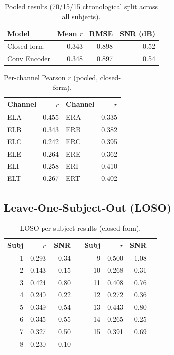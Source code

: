\documentclass[11pt,a4paper]{article}
\begin{document}
\begin{table}[H]
\centering
\caption{Pooled results (70/15/15 chronological split across all subjects).}
\begin{tabular}{lrrr}
\toprule
Model & Mean $r$ & RMSE & SNR (dB) \\
\midrule
Closed-form & 0.343 & 0.898 & 0.52 \\
Conv Encoder & 0.348 & 0.897 & 0.54 \\
\bottomrule
\end{tabular}
\end{table}

\begin{table}[H]
\centering
\caption{Per-channel Pearson $r$ (pooled, closed-form).}
\begin{tabular}{lrlr}
\toprule
Channel & $r$ & Channel & $r$ \\
\midrule
ELA & \textcolor{good}{0.455} & ERA & 0.335 \\
ELB & 0.343 & ERB & 0.382 \\
ELC & 0.242 & ERC & 0.395 \\
ELE & 0.264 & ERE & 0.362 \\
ELI & 0.258 & ERI & \textcolor{good}{0.410} \\
ELT & 0.267 & ERT & 0.402 \\
\bottomrule
\end{tabular}
\end{table}

\subsection{Leave-One-Subject-Out (LOSO)}

\begin{table}[H]
\centering
\caption{LOSO per-subject results (closed-form).}
\begin{tabular}{rrrr|rrrr}
\toprule
Subj & $r$ & SNR & & Subj & $r$ & SNR \\
\midrule
1  & 0.293 & 0.34 &  & 9  & \textcolor{good}{0.500} & 1.08 \\
2  & \textcolor{moderate}{0.143} & $-0.15$ & & 10 & 0.268 & 0.31 \\
3  & \textcolor{good}{0.424} & 0.80 &  & 11 & 0.408 & 0.76 \\
4  & 0.240 & 0.22 &  & 12 & 0.272 & 0.36 \\
5  & 0.349 & 0.54 &  & 13 & \textcolor{good}{0.443} & 0.80 \\
6  & 0.345 & 0.55 &  & 14 & 0.265 & 0.25 \\
7  & 0.327 & 0.50 &  & 15 & 0.391 & 0.69 \\
8  & 0.230 & 0.10 &  &    &       &      \\
\bottomrule
\end{tabular}
\end{table}
\end{document}
